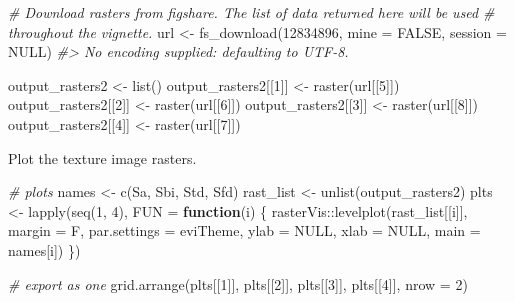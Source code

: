 \documentclass[
]{article}
\newenvironment{Shaded}{\begin{snugshade}}{\end{snugshade}}
\newcommand{\AttributeTok}[1]{\textcolor[rgb]{0.77,0.63,0.00}{#1}}
\newcommand{\CommentTok}[1]{\textcolor[rgb]{0.56,0.35,0.01}{\textit{#1}}}
\newcommand{\ConstantTok}[1]{\textcolor[rgb]{0.00,0.00,0.00}{#1}}
\newcommand{\ControlFlowTok}[1]{\textcolor[rgb]{0.13,0.29,0.53}{\textbf{#1}}}
\newcommand{\DecValTok}[1]{\textcolor[rgb]{0.00,0.00,0.81}{#1}}
\newcommand{\FunctionTok}[1]{\textcolor[rgb]{0.00,0.00,0.00}{#1}}
\newcommand{\NormalTok}[1]{#1}
\newcommand{\OtherTok}[1]{\textcolor[rgb]{0.56,0.35,0.01}{#1}}
\newcommand{\SpecialCharTok}[1]{\textcolor[rgb]{0.00,0.00,0.00}{#1}}
\newcommand{\StringTok}[1]{\textcolor[rgb]{0.31,0.60,0.02}{#1}}
\begin{document}
\begin{Shaded}
\begin{Highlighting}[]
\CommentTok{\# Download rasters from figshare. The list of data returned here will be used}
\CommentTok{\# throughout the vignette.}
\NormalTok{url }\OtherTok{\textless{}{-}} \FunctionTok{fs\_download}\NormalTok{(}\DecValTok{12834896}\NormalTok{, }\AttributeTok{mine =} \ConstantTok{FALSE}\NormalTok{, }\AttributeTok{session =} \ConstantTok{NULL}\NormalTok{)}
\CommentTok{\#\textgreater{} No encoding supplied: defaulting to UTF{-}8.}

\NormalTok{output\_rasters2 }\OtherTok{\textless{}{-}} \FunctionTok{list}\NormalTok{()}
\NormalTok{output\_rasters2[[}\DecValTok{1}\NormalTok{]] }\OtherTok{\textless{}{-}} \FunctionTok{raster}\NormalTok{(url[[}\DecValTok{5}\NormalTok{]])}
\NormalTok{output\_rasters2[[}\DecValTok{2}\NormalTok{]] }\OtherTok{\textless{}{-}} \FunctionTok{raster}\NormalTok{(url[[}\DecValTok{6}\NormalTok{]])}
\NormalTok{output\_rasters2[[}\DecValTok{3}\NormalTok{]] }\OtherTok{\textless{}{-}} \FunctionTok{raster}\NormalTok{(url[[}\DecValTok{8}\NormalTok{]])}
\NormalTok{output\_rasters2[[}\DecValTok{4}\NormalTok{]] }\OtherTok{\textless{}{-}} \FunctionTok{raster}\NormalTok{(url[[}\DecValTok{7}\NormalTok{]])}
\end{Highlighting}
\end{Shaded}

Plot the texture image rasters.

\begin{Shaded}
\begin{Highlighting}[]
\CommentTok{\# plots}
\NormalTok{names }\OtherTok{\textless{}{-}} \FunctionTok{c}\NormalTok{(}\StringTok{\textquotesingle{}Sa\textquotesingle{}}\NormalTok{, }\StringTok{\textquotesingle{}Sbi\textquotesingle{}}\NormalTok{, }\StringTok{\textquotesingle{}Std\textquotesingle{}}\NormalTok{, }\StringTok{\textquotesingle{}Sfd\textquotesingle{}}\NormalTok{)}
\NormalTok{rast\_list }\OtherTok{\textless{}{-}} \FunctionTok{unlist}\NormalTok{(output\_rasters2) }
\NormalTok{plts }\OtherTok{\textless{}{-}} \FunctionTok{lapply}\NormalTok{(}\FunctionTok{seq}\NormalTok{(}\DecValTok{1}\NormalTok{, }\DecValTok{4}\NormalTok{), }\AttributeTok{FUN =} \ControlFlowTok{function}\NormalTok{(i) \{}
\NormalTok{  rasterVis}\SpecialCharTok{::}\FunctionTok{levelplot}\NormalTok{(rast\_list[[i]], }\AttributeTok{margin =}\NormalTok{ F, }\AttributeTok{par.settings =}\NormalTok{ eviTheme, }
                       \AttributeTok{ylab =} \ConstantTok{NULL}\NormalTok{, }\AttributeTok{xlab =} \ConstantTok{NULL}\NormalTok{, }\AttributeTok{main =}\NormalTok{ names[i])}
\NormalTok{\})}

\CommentTok{\# export as one}
\FunctionTok{grid.arrange}\NormalTok{(plts[[}\DecValTok{1}\NormalTok{]], plts[[}\DecValTok{2}\NormalTok{]], plts[[}\DecValTok{3}\NormalTok{]], plts[[}\DecValTok{4}\NormalTok{]], }\AttributeTok{nrow =} \DecValTok{2}\NormalTok{)}
\end{Highlighting}
\end{Shaded}
\end{document}
